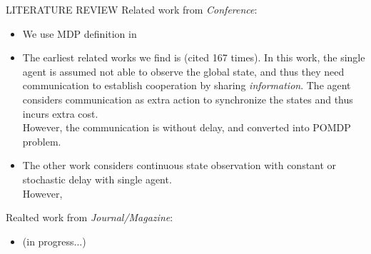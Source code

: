 \documentclass[10pt, conference, letterpaper]{IEEEtran}
\begin{document}
    \begin{section}{LITERATURE REVIEW}
        \label{sec:review}
        Related work from \emph{Conference}:
        \begin{itemize}
            \item We use MDP definition in \cite{sutton1998introduction}
            \item The earliest related works we find is \cite{ref-01} (cited 167 times). In this work, the single agent is assumed not able to observe the global state, and thus they need communication to establish cooperation by sharing \emph{information}. The agent considers communication as extra action to synchronize the states and thus incurs extra cost. \\
            However, the communication is without delay, and converted into POMDP problem.
            \item The other work \cite{ref-02} considers continuous state observation with constant or stochastic delay with single agent. \\
            However, 
        \end{itemize}

        Realted work from \emph{Journal/Magazine}:
        \begin{itemize}
            \item (in progress...)
        \end{itemize}
    \end{section}
\end{document}

